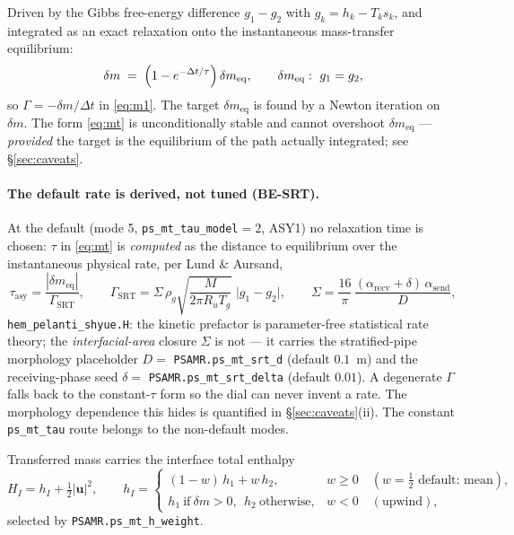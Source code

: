 \documentclass[11pt,a4paper]{article}
\newcommand{\uvec}{\mathbf{u}}
\newcommand{\code}[1]{\texttt{\small #1}}
\newcommand{\src}[1]{{\color{gray}\code{#1}}}
\begin{document}
Driven by the Gibbs free-energy difference $g_1-g_2$ with $g_k=h_k-T_ks_k$,
and integrated as an exact relaxation onto the instantaneous mass-transfer
equilibrium:
\begin{equation}
  \delta m \;=\; \Bigl(1-e^{-\Delta t/\tau}\Bigr)\,\delta m_{\mathrm{eq}},
  \qquad
  \delta m_{\mathrm{eq}}:\ g_1 = g_2 ,
  \label{eq:mt}
\end{equation}
so $\Gamma = -\delta m/\Delta t$ in \eqref{eq:m1}.  The target
$\delta m_{\mathrm{eq}}$ is found by a Newton iteration on $\delta m$.  The
form \eqref{eq:mt} is unconditionally stable and cannot overshoot
$\delta m_{\mathrm{eq}}$ --- \emph{provided} the target is the equilibrium of
the path actually integrated; see \S\ref{sec:caveats}.

\paragraph{The default rate is derived, not tuned (BE-SRT).}
At the default (mode 5, \code{ps\_mt\_tau\_model}$=2$, ASY1) no relaxation
time is chosen: $\tau$ in \eqref{eq:mt} is \emph{computed} as the distance
to equilibrium over the instantaneous physical rate, per Lund \& Aursand,
\begin{equation}
  \tau_{\mathrm{asy}} = \frac{|\delta m_{\mathrm{eq}}|}{\Gamma_{\!\mathrm{SRT}}},
  \qquad
  \Gamma_{\!\mathrm{SRT}}
    = \Sigma\,\rho_g\sqrt{\frac{M}{2\pi R_u T_g}}\;\bigl|g_1-g_2\bigr|,
  \qquad
  \Sigma = \frac{16}{\pi}\,
           \frac{(\alpha_{\mathrm{recv}}+\delta)\,\alpha_{\mathrm{send}}}{D},
  \label{eq:srt}
\end{equation}
\src{hem\_pelanti\_shyue.H}: the kinetic prefactor is
parameter-free statistical rate theory; the \emph{interfacial-area} closure
$\Sigma$ is not --- it carries the stratified-pipe morphology placeholder
$D=$ \code{PSAMR.ps\_mt\_srt\_d} (default $0.1$~m) and the receiving-phase
seed $\delta=$ \code{PSAMR.ps\_mt\_srt\_delta} (default $0.01$).  A
degenerate $\Gamma$ falls back to the constant-$\tau$ form so the dial can
never invent a rate.  The morphology dependence this hides is quantified in
\S\ref{sec:caveats}(ii).  The constant \code{ps\_mt\_tau} route belongs to
the non-default modes.

Transferred mass carries the interface total enthalpy
\begin{equation}
  H_{\!I} = h_{\!I} + \tfrac12|\uvec|^2,
  \qquad
  h_{\!I} =
  \begin{cases}
    (1-w)\,h_1 + w\,h_2, & w \ge 0 \quad(w=\tfrac12 \text{ default: mean}),\\[2pt]
    h_1 \ \text{if}\ \delta m>0,\ \ h_2 \ \text{otherwise}, & w<0 \quad(\text{upwind}),
  \end{cases}
  \label{eq:carrier}
\end{equation}
selected by \code{PSAMR.ps\_mt\_h\_weight}.
\end{document}

